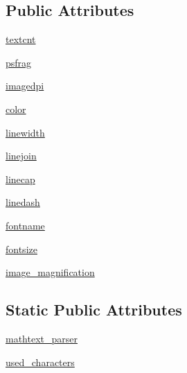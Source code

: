 \subsection*{Public Attributes}
\begin{DoxyCompactItemize}
\item 
\hyperlink{classmatplotlib_1_1backends_1_1backend__ps_1_1RendererPS_a7418cdca865449587274f5cc3c068152}{textcnt}
\item 
\hyperlink{classmatplotlib_1_1backends_1_1backend__ps_1_1RendererPS_ac7f21086c3438d0e5efa67dd8fc2e173}{psfrag}
\item 
\hyperlink{classmatplotlib_1_1backends_1_1backend__ps_1_1RendererPS_af5ddad781f61ad35a408149cb1c498bf}{imagedpi}
\item 
\hyperlink{classmatplotlib_1_1backends_1_1backend__ps_1_1RendererPS_a02b942cfebfc3c42890ba8f9e3ea6c33}{color}
\item 
\hyperlink{classmatplotlib_1_1backends_1_1backend__ps_1_1RendererPS_a0cab6a6010b3cce17d8378360d2c9613}{linewidth}
\item 
\hyperlink{classmatplotlib_1_1backends_1_1backend__ps_1_1RendererPS_a12770e854540717857c7f98ce02cf472}{linejoin}
\item 
\hyperlink{classmatplotlib_1_1backends_1_1backend__ps_1_1RendererPS_adb33d0ab82babb05eef5425ff90956e1}{linecap}
\item 
\hyperlink{classmatplotlib_1_1backends_1_1backend__ps_1_1RendererPS_a492fe869df6ce0142fd3e544bb17955e}{linedash}
\item 
\hyperlink{classmatplotlib_1_1backends_1_1backend__ps_1_1RendererPS_acaa9986fe93740d50865b1ec99a0f502}{fontname}
\item 
\hyperlink{classmatplotlib_1_1backends_1_1backend__ps_1_1RendererPS_a3a73de7fa5c86f8bfa3971b3ffc9b5ae}{fontsize}
\item 
\hyperlink{classmatplotlib_1_1backends_1_1backend__ps_1_1RendererPS_a3f3bbb2bb1356ba3313ec98248759a07}{image\+\_\+magnification}
\end{DoxyCompactItemize}
\subsection*{Static Public Attributes}
\begin{DoxyCompactItemize}
\item 
\hyperlink{classmatplotlib_1_1backends_1_1backend__ps_1_1RendererPS_a4ea01120f62b105da4195fb30e7c388b}{mathtext\+\_\+parser}
\item 
\hyperlink{classmatplotlib_1_1backends_1_1backend__ps_1_1RendererPS_aeb5c34d9f46f2a11b7807b7dbdd3bf08}{used\+\_\+characters}
\end{DoxyCompactItemize}


